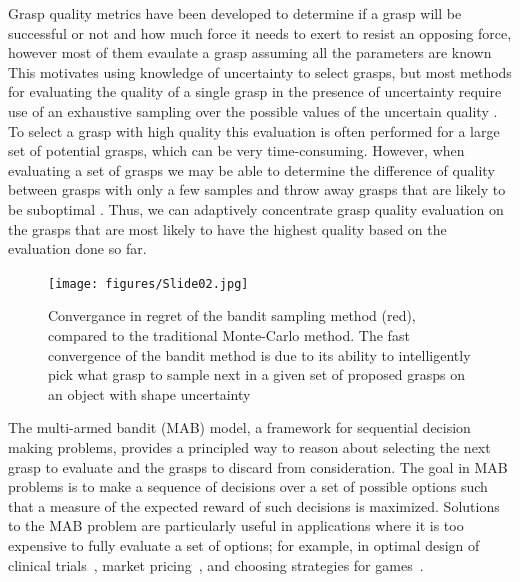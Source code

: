 \documentclass[letterpaper, 10 pt, conference]{ieeeconf}  %
\begin{document}
Grasp quality metrics have been developed to determine if a grasp will be successful or not and how much force it needs to exert to resist an opposing force, however most of them evaulate a grasp assuming all the parameters are known \cite{ferrari1992}
This motivates using knowledge of uncertainty to select grasps, but most methods for evaluating the quality of a single grasp in the presence of uncertainty require use of an exhaustive sampling over the possible values of the uncertain quality \cite{kehoe2012toward, kim2012physically, weisz2012pose}.
To select a grasp with high quality this evaluation is often performed for a large set of potential grasps, which can be very time-consuming.
However, when evaluating a set of grasps we may be able to determine the difference of quality between grasps with only a few samples and throw away grasps that are likely to be suboptimal \cite{kehoe2012estimating}.
Thus, we can adaptively concentrate grasp quality evaluation on the grasps that are most likely to have the highest quality based on the evaluation done so far.

\begin{figure}[t!]
\centering
\texttt{[image: figures/Slide02.jpg]}
\caption{\footnotesize
Convergance in regret of the bandit sampling method (red), compared to the traditional Monte-Carlo method. The fast convergence of the bandit method is due to its ability to intelligently pick what grasp to sample next in a given set of proposed grasps on an object with shape uncertainty}
\vspace*{-10pt}
\label{fig:noisy data}
\end{figure}

The multi-armed bandit (MAB) model, a framework for sequential decision making problems,\cite{barto1998reinforcement, lai1985asymptotically, robbins1952some} provides a principled way to reason about selecting the next grasp to evaluate and the grasps to discard from consideration.
The goal in MAB problems is to make a sequence of decisions over a set of possible options such that a measure of the expected reward of such decisions is maximized.
Solutions to the MAB problem are particularly useful in applications where it is too expensive to fully evaluate a set of options; for example, in optimal design of clinical trials~\cite{simon1989optimal}, market pricing~\cite{rothschild1974two}, and choosing strategies for games~\cite{st2012online}.
\end{document}

